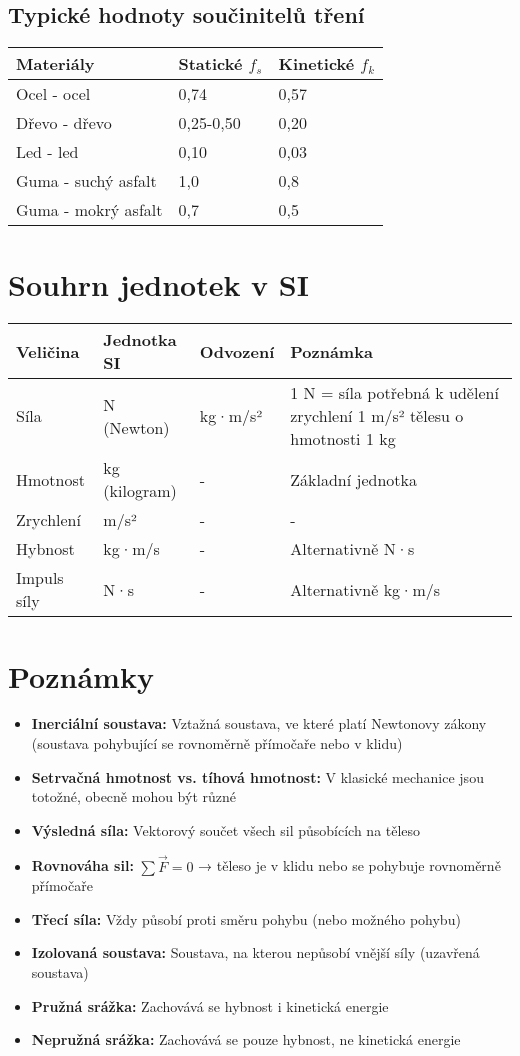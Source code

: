 \documentclass[11pt,a4paper]{article}
\begin{document}
\subsection{Typické hodnoty součinitelů tření}

\begin{longtable}{lll}
\toprule
Materiály & Statické $f_s$ & Kinetické $f_k$ \\
\midrule
Ocel - ocel & 0,74 & 0,57 \\
Dřevo - dřevo & 0,25-0,50 & 0,20 \\
Led - led & 0,10 & 0,03 \\
Guma - suchý asfalt & 1,0 & 0,8 \\
Guma - mokrý asfalt & 0,7 & 0,5 \\
\bottomrule
\end{longtable}

\clearpage

\section{Souhrn jednotek v SI}

\begin{longtable}{llll}
\toprule
Veličina & Jednotka SI & Odvození & Poznámka \\
\midrule
Síla & N (Newton) & kg·m/s² & 1 N = síla potřebná k udělení zrychlení 1 m/s² tělesu o hmotnosti 1 kg \\
Hmotnost & kg (kilogram) & - & Základní jednotka \\
Zrychlení & m/s² & - & - \\
Hybnost & kg·m/s & - & Alternativně N·s \\
Impuls síly & N·s & - & Alternativně kg·m/s \\
\bottomrule
\end{longtable}

\clearpage

\section*{Poznámky}

\begin{itemize}
\item \textbf{Inerciální soustava:} Vztažná soustava, ve které platí Newtonovy zákony (soustava pohybující se rovnoměrně přímočaře nebo v klidu)
\item \textbf{Setrvačná hmotnost vs. tíhová hmotnost:} V klasické mechanice jsou totožné, obecně mohou být různé
\item \textbf{Výsledná síla:} Vektorový součet všech sil působících na těleso
\item \textbf{Rovnováha sil:} $\sum \vec{F} = 0$ → těleso je v klidu nebo se pohybuje rovnoměrně přímočaře
\item \textbf{Třecí síla:} Vždy působí proti směru pohybu (nebo možného pohybu)
\item \textbf{Izolovaná soustava:} Soustava, na kterou nepůsobí vnější síly (uzavřená soustava)
\item \textbf{Pružná srážka:} Zachovává se hybnost i kinetická energie
\item \textbf{Nepružná srážka:} Zachovává se pouze hybnost, ne kinetická energie
\end{itemize}
\end{document}
